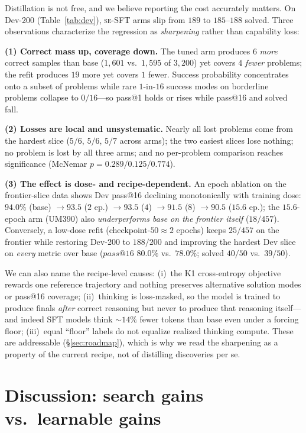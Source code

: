 \documentclass{article}
\makeatletter
\newcommand{\se}{\textnormal{\textsc{se}}}
\newcommand{\pass}[1]{pass@#1}
\makeatother
\begin{document}
Distillation is not free, and we believe reporting the cost accurately matters. On Dev-200 (Table~\ref{tab:dev}), \se{}-SFT arms slip from $189$ to $185$--$188$ solved. Three observations characterize the regression as \emph{sharpening} rather than capability loss:

\textbf{(1) Correct mass up, coverage down.} The tuned arm produces $6$ \emph{more} correct samples than base ($1{,}601$ vs.\ $1{,}595$ of $3{,}200$) yet covers $4$ \emph{fewer} problems; the refit produces $19$ more yet covers $1$ fewer. Success probability concentrates onto a subset of problems while rare $1$-in-$16$ success modes on borderline problems collapse to $0/16$---so \pass{1} holds or rises while \pass{16} and solved fall.

\textbf{(2) Losses are local and unsystematic.} Nearly all lost problems come from the hardest slice ($5/6$, $5/6$, $5/7$ across arms); the two easiest slices lose nothing; no problem is lost by all three arms; and no per-problem comparison reaches significance (McNemar $p = 0.289 / 0.125 / 0.774$).

\textbf{(3) The effect is dose- and recipe-dependent.} An epoch ablation on the frontier-slice data shows Dev \pass{16} declining monotonically with training dose: $94.0\%$ (base) $\to 93.5$ ($2$ ep.) $\to 93.5$ ($4$) $\to 91.5$ ($8$) $\to 90.5$ ($15.6$ ep.); the $15.6$-epoch arm (UM390) also \emph{underperforms base on the frontier itself} ($18/457$). Conversely, a low-dose refit (checkpoint-$50 \approx 2$ epochs) keeps $25/457$ on the frontier while restoring Dev-200 to $188/200$ and improving the hardest Dev slice on \emph{every} metric over base ($\pass{16}$ $80.0\%$ vs.\ $78.0\%$; solved $40/50$ vs.\ $39/50$).

We can also name the recipe-level causes: (i)~the K1 cross-entropy objective rewards one reference trajectory and nothing preserves alternative solution modes or \pass{16} coverage; (ii)~thinking is loss-masked, so the model is trained to produce finals \emph{after} correct reasoning but never to produce that reasoning itself---and indeed SFT models think ${\sim}14\%$ fewer tokens than base even under a forcing floor; (iii)~equal ``floor'' labels do not equalize realized thinking compute. These are addressable (\S\ref{sec:roadmap}), which is why we read the sharpening as a property of the current recipe, not of distilling discoveries per se.

\section{Discussion: search gains vs.\ learnable gains}
\label{sec:discussion}
\end{document}
